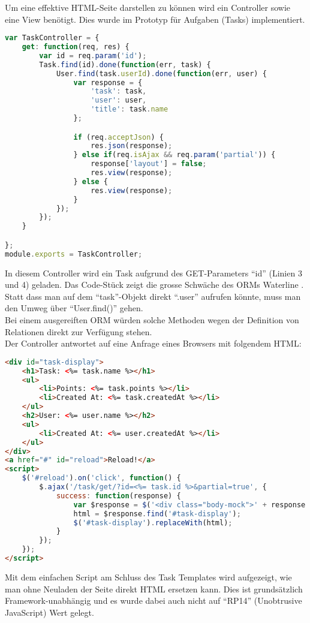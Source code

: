 Um eine effektive HTML-Seite darstellen zu können wird ein Controller sowie eine View benötigt. Dies wurde im Prototyp für Aufgaben (Tasks) implementiert.\\

\begin{lstlisting}[language=JavaScript, caption=Task Controller in Sails.js, label=lst:sailsjstaskcontroller]
var TaskController = {
	get: function(req, res) {
		var id = req.param('id');
		Task.find(id).done(function(err, task) {
			User.find(task.userId).done(function(err, user) {
				var response = {
					'task': task,
					'user': user,
					'title': task.name
				};

				if (req.acceptJson) {
					res.json(response);
				} else if(req.isAjax && req.param('partial')) {
					response['layout'] = false;
					res.view(response);
				} else {
					res.view(response);
				}
			});
		});
	}

};
module.exports = TaskController;
\end{lstlisting}

In diesem Controller wird ein Task aufgrund des GET-Parameters ``id'' (Linien 3 und 4) geladen. Das Code-Stück zeigt die grosse Schwäche des ORMs Waterline \cite{Waterline}. Statt dass man auf dem ``task''-Objekt direkt ``.user'' aufrufen könnte, muss man den Umweg über ``User.find()'' gehen. \\
Bei einem ausgereiften ORM würden solche Methoden wegen der Definition von Relationen direkt zur Verfügung stehen.\\[0.5mm]

Der Controller antwortet auf eine Anfrage eines Browsers mit folgendem HTML:

\begin{lstlisting}[language=HTML, caption=Task Template]
<div id="task-display">
	<h1>Task: <%= task.name %></h1>
	<ul>
		<li>Points: <%= task.points %></li>
		<li>Created At: <%= task.createdAt %></li>
	</ul>
	<h2>User: <%= user.name %></h2>
	<ul>
		<li>Created At: <%= user.createdAt %></li>
	</ul>
</div>
<a href="#" id="reload">Reload!</a>
<script>
	$('#reload').on('click', function() {
		$.ajax('/task/get/?id=<%= task.id %>&partial=true', {
			success: function(response) {
				var $response = $('<div class="body-mock">' + response + '</div>');
				html = $response.find('#task-display');
				$('#task-display').replaceWith(html);
			}
		});
	});
</script>
\end{lstlisting}

Mit dem einfachen Script am Schluss des Task Templates wird aufgezeigt, wie man ohne Neuladen der Seite direkt HTML ersetzen kann. Dies ist grundsätzlich Framework-unabhängig und es wurde dabei auch nicht auf ``RP14'' (Unobtrusive JavaScript) Wert gelegt.

